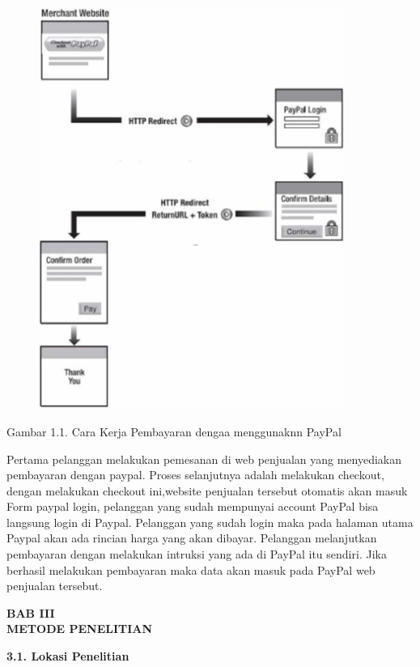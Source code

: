 \documentclass[11pt]{article}
\begin{document}
\begin{figure}[ht!]
  \centering
    \includegraphics[width=10cm]{gambar/paypal}
    \label{paypal}
\end{figure}

\begin{center}
Gambar 1.1. Cara Kerja Pembayaran dengaa menggunaknn PayPal
\end{center}

Pertama pelanggan melakukan pemesanan di web penjualan yang menyediakan pembayaran dengan paypal. Proses selanjutnya adalah melakukan checkout, dengan melakukan checkout ini,website penjualan tersebut otomatis akan masuk Form paypal login, pelanggan yang sudah mempunyai account PayPal bisa langsung login di Paypal. Pelanggan yang sudah login maka pada halaman utama Paypal akan ada  rincian harga yang akan dibayar. Pelanggan melanjutkan pembayaran dengan melakukan intruksi yang ada di PayPal itu sendiri. Jika berhasil melakukan pembayaran maka data akan masuk pada PayPal web penjualan tersebut.

\newpage

\begin{center}
\textbf{BAB III
\\
METODE PENELITIAN}
\end{center}

\textbf{3.1. Lokasi Penelitian}
\end{document}

